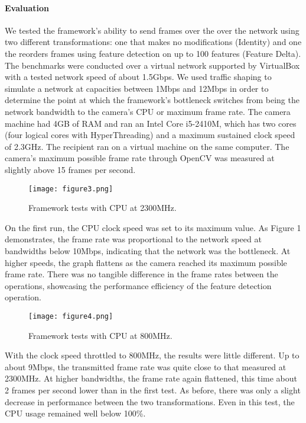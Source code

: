 \paragraph{Evaluation}

We tested the framework's ability to send frames over the over the network
using two different transformations: one that makes no modifications
(Identity) and one the reorders frames using feature detection on up to
100 features (Feature Delta).  The benchmarks were conducted over a
virtual network supported by VirtualBox with a tested network speed of about 1.5Gbps.
We used traffic shaping to simulate a network at capacities between 1Mbps and 12Mbps in order to
determine the point at which the framework's bottleneck switches from being the
network bandwidth to the camera's CPU or maximum frame rate.  The camera machine had 4GB of RAM
and ran an Intel Core i5-2410M, which has two cores (four logical cores with HyperThreading)
and a maximum sustained clock speed of 2.3GHz.  The recipient
ran on a virtual machine on the same computer.  The camera's maximum possible
frame rate through OpenCV was measured at slightly above 15 frames per second.

\begin{figure}[h]
\texttt{[image: figure3.png]}
\caption{Framework tests with CPU at 2300MHz.}
\end{figure}

On the first run, the CPU clock speed was set to its maximum value. As Figure 1
demonstrates, the frame rate was proportional to the network speed at bandwidths
below 10Mbps, indicating that the network was the bottleneck.  At higher speeds,
the graph flattens as the camera reached its maximum possible frame rate.
There was no tangible difference in the frame rates between the operations,
showcasing the performance efficiency of the feature detection operation.

\begin{figure}
\texttt{[image: figure4.png]}
\caption{Framework tests with CPU at 800MHz.}
\end{figure}

With the clock speed throttled to 800MHz, the results were little different.  Up to about
9Mbps, the transmitted frame rate was quite close to that measured at 2300MHz.  At
higher bandwidths, the frame rate again flattened, this time about 2 frames per second
lower than in the first test.  As before, there was only a slight decrease in performance
between the two transformations.  Even in this test, the CPU usage remained well
below 100\%.

